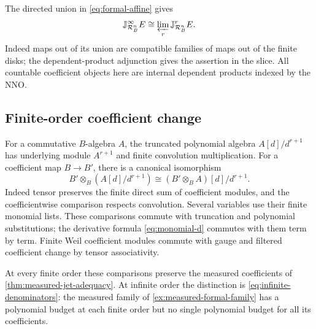 \documentclass[11pt,a4paper]{article}
\numberwithin{algorithm}{section}
\numberwithin{equation}{section}
\theoremstyle{definition}
\theoremstyle{remark}
\theoremstyle{plain}
\newcommand{\Rline}{\mathcal R_B}
\theoremstyle{definition}
\theoremstyle{plain}
\begin{document}
The directed union in \eqref{eq:formal-affine} gives
\[
 \mathbb J_{\Rline^n}^\infty E
 \cong\varprojlim_r\mathbb J_{\Rline^n}^rE.
\]
Indeed maps out of its union are compatible families of
maps out of the finite disks; the dependent-product
adjunction gives the assertion in the slice.
All countable coefficient objects here are internal
dependent products indexed by the NNO.

\subsection{Finite-order coefficient change}
For a commutative $B$-algebra $A$, the truncated polynomial
algebra $A[d]/d^{r+1}$ has underlying module $A^{r+1}$ and finite
convolution multiplication. For a coefficient map $B\to B'$, there is
a canonical isomorphism
\[
 B'\otimes_B(A[d]/d^{r+1})
 \cong(B'\otimes_B A)[d]/d^{r+1}.
\]
Indeed tensor preserves the finite direct sum of coefficient modules,
and the coefficientwise comparison respects convolution. Several
variables use their finite monomial lists. These comparisons commute
with truncation and polynomial substitutions; the derivative formula
\eqref{eq:monomial-d} commutes with them term by term. Finite Weil
coefficient modules commute with gauge and filtered coefficient change
by tensor associativity.

At every finite order these comparisons preserve the measured
coefficients of \cref{thm:measured-jet-adequacy}. At infinite order the
distinction is \eqref{eq:infinite-denominators}: the measured family
of \cref{ex:measured-formal-family} has a polynomial budget at each
finite order but no single polynomial budget for all its coefficients.
\end{document}
